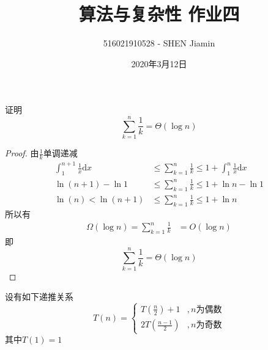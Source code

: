 \documentclass[answers]{exam}
\title{算法与复杂性 \quad 作业四}
\author{516021910528 - SHEN Jiamin}
\date{2020年3月12日}
\begin{document}
\maketitle

\begin{questions}

    \question 证明$$\sum_{k=1}^n {\frac{1}{k}} = \Theta(\log n)$$
    \begin{solution}
        \begin{proof}
            由$\frac{1}{k}$单调递减\begin{align*}
                \int_{1}^{n+1} {\frac{1}{x}} \mathrm{d}x
                                      & \leq \sum_{k=1}^n {\frac{1}{k}} \leq 1 + \int_1^{n} {\frac{1}{x}} \mathrm{d}x \\
                \ln{(n+1)} - \ln{1}   & \leq \sum_{k=1}^n {\frac{1}{k}} \leq 1 + \ln{n} - \ln{1}                      \\
                \ln{(n)} < \ln{(n+1)} & \leq \sum_{k=1}^n {\frac{1}{k}} \leq 1 + \ln{n}
            \end{align*}
            所以有\begin{align*}
                \Omega(\log{n}) = \sum_{k=1}^n {\frac{1}{k}} & = O(\log{n})
            \end{align*}
            即$$
                \sum_{k=1}^n {\frac{1}{k}} = \Theta(\log{n})
            $$
        \end{proof}
    \end{solution}

    \newpage

    \question 设有如下递推关系 $$
        T(n) = \begin{cases}
            T(\frac{n}{2}) + 1 & , n\text{为偶数} \\
            2T(\frac{n-1}{2})  & , n\text{为奇数}
        \end{cases}
    $$其中$T(1) = 1$
\end{questions}
\end{document}
